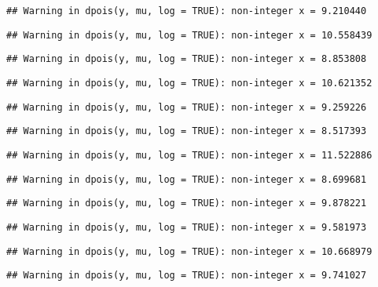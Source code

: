 \documentclass[
]{article}
\begin{document}
\begin{verbatim}
## Warning in dpois(y, mu, log = TRUE): non-integer x = 9.210440
\end{verbatim}

\begin{verbatim}
## Warning in dpois(y, mu, log = TRUE): non-integer x = 10.558439
\end{verbatim}

\begin{verbatim}
## Warning in dpois(y, mu, log = TRUE): non-integer x = 8.853808
\end{verbatim}

\begin{verbatim}
## Warning in dpois(y, mu, log = TRUE): non-integer x = 10.621352
\end{verbatim}

\begin{verbatim}
## Warning in dpois(y, mu, log = TRUE): non-integer x = 9.259226
\end{verbatim}

\begin{verbatim}
## Warning in dpois(y, mu, log = TRUE): non-integer x = 8.517393
\end{verbatim}

\begin{verbatim}
## Warning in dpois(y, mu, log = TRUE): non-integer x = 11.522886
\end{verbatim}

\begin{verbatim}
## Warning in dpois(y, mu, log = TRUE): non-integer x = 8.699681
\end{verbatim}

\begin{verbatim}
## Warning in dpois(y, mu, log = TRUE): non-integer x = 9.878221
\end{verbatim}

\begin{verbatim}
## Warning in dpois(y, mu, log = TRUE): non-integer x = 9.581973
\end{verbatim}

\begin{verbatim}
## Warning in dpois(y, mu, log = TRUE): non-integer x = 10.668979
\end{verbatim}

\begin{verbatim}
## Warning in dpois(y, mu, log = TRUE): non-integer x = 9.741027
\end{verbatim}
\end{document}
